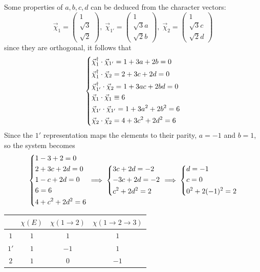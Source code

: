 Some properties of $a,b,c,d$ can be deduced from the character vectors:
$$\vec{\chi}_1=\begin{pmatrix}
1\\\sqrt{3}\\\sqrt{2}
\end{pmatrix},\; \vec{\chi}_{1'}=\begin{pmatrix}
1\\\sqrt{3}a\\\sqrt{2}b
\end{pmatrix},\; \vec{\chi}_{2}=\begin{pmatrix}
1\\\sqrt{3}c\\\sqrt{2}d
\end{pmatrix}
$$
since they are orthogonal, it follows that
$$
\begin{dcases*}
\vec{\chi}_1^\dagger\cdot\vec{\chi}_{1'} = 1+3a+2b=0\\
\vec{\chi}_1^\dagger\cdot\vec{\chi}_2 = 2+3c+2d=0\\
\vec{\chi}_{1'}^\dagger\cdot\vec{\chi}_2 = 1+3ac+2bd=0\\
\vec{\chi}_1\cdot\vec{\chi}_1\equiv 6\\
\vec{\chi}_{1'}\cdot\vec{\chi}_{1'} = 1+3a^2+2b^2 = 6\\
\vec{\chi}_2\cdot\vec{\chi}_2 = 4+3c^2+2d^2 = 6
\end{dcases*}
$$
Since the $1'$ representation maps the elements to their parity, $a=-1$ and $b=1$,
so the system becomes
$$\begin{dcases*}
1-3+2=0\\
2+3c+2d=0\\
1-c+2d=0\\
6=6\\
4+c^2+2d^2=6
\end{dcases*}\implies
\begin{dcases*}
3c+2d = -2\\
-3c+2d = -2\\
c^2+2d^2 = 2
\end{dcases*}\implies\begin{dcases*}
d = -1\\
c = 0\\
0^2+2(-1)^2 = 2
\end{dcases*}
$$
\begin{table}[h]
    \centering
    \begin{tabular}{c|c|c|c}
            &$\chi(E)$&$\chi(1\to2)$&$\chi(1\to2\to3)$\\ \hline
        $1$ &   $1$&$1$&$1$\\\hline
        $1'$&   $1$&$-1$&$1$\\\hline
        $2$ &   $1$&$0$&$-1$
\end{tabular}
\end{table}\\

